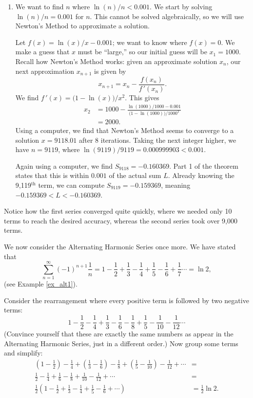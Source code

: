 \documentclass[10pt]{article}
\newcommand{\fp}{\ensuremath{f\,'}}
\begin{document}
{{\begin{enumerate}
	We can use Part 2 of the theorem to obtain an even more accurate result. As we know the $10^{\text{th}}$ term of the series is $-1/1000$, we can easily compute $S_{10} = 0.901116$. Part 2 of the theorem states that $L$ is between $S_9$ and $S_{10}$, so $0.901116 <L<0.902116$.
	
	
	\item		We want to find $n$ where $\ln (n)/n < 0.001$. We start by solving $\ln (n)/n = 0.001$ for $n$. This cannot be solved algebraically, so we will use Newton's Method to approximate a solution. 
	
	Let $f(x) = \ln(x)/x-0.001$; we want to know where $f(x) = 0$. We make a guess that $x$ must be ``large,'' so our initial guess will be $x_1=1000$. Recall how Newton's Method works: given an approximate solution $x_n$, our next approximation $x_{n+1}$ is given by
	$$x_{n+1} = x_n - \frac{f(x_n)}{\fp(x_n)}.$$
	We find $\fp(x) = \big(1-\ln(x)\big)/x^2$. This gives
	\begin{align*}
	x_2 &= 1000 - \frac{\ln(1000)/1000-0.001}{\big(1-\ln(1000)\big)/1000^2} \\
			&= 2000.
	\end{align*}
	Using a computer, we find that Newton's Method seems to converge to a solution $x=9118.01$ after 8 iterations. Taking the next integer higher, we have $n=9119$, where $\ln(9119)/9119 =0.000999903<0.001$.
	
	Again using a computer, we find $S_{9118} = -0.160369$. Part 1 of the theorem states that this is within $0.001$ of the actual sum $L$. Already knowing the 9,119$^{\text{th}}$ term, we can compute $S_{9119} = -0.159369$, meaning $-0.159369 < L < -0.160369$. 
	
\end{enumerate}
Notice how the first series converged quite quickly, where we needed only 10 terms to reach the desired accuracy, whereas the second series took over 9,000 terms.
}

We now consider the Alternating Harmonic Series once more. We have stated that 
$$\sum_{n=1}^\infty (-1)^{n+1}\frac1n = 1-\frac12+\frac13-\frac14+\frac15-\frac16+\frac17\cdots = \ln 2,$$
(see Example \ref{ex_alt1}). 

Consider the rearrangement where every positive term is followed by two negative terms:
$$
1-\frac12-\frac14+\frac13-\frac16-\frac18+\frac15-\frac1{10}-\frac1{12}\cdots
$$
(Convince yourself that these are exactly the same numbers as appear in the Alternating Harmonic Series, just in a different order.) Now group some terms and simplify:
\begin{align*}
\left(1-\frac12\right)-\frac14+\left(\frac13-\frac16\right)-\frac18+\left(\frac15-\frac1{10}\right)-\frac1{12}+\cdots &= \\
\frac12-\frac14+\frac16-\frac18+\frac1{10}-\frac{1}{12}+\cdots &= \\
\frac12\left(1-\frac12+\frac13-\frac14+\frac15-\frac16+\cdots\right) & = \frac12\ln 2.
\end{align*}

}
\end{document}
